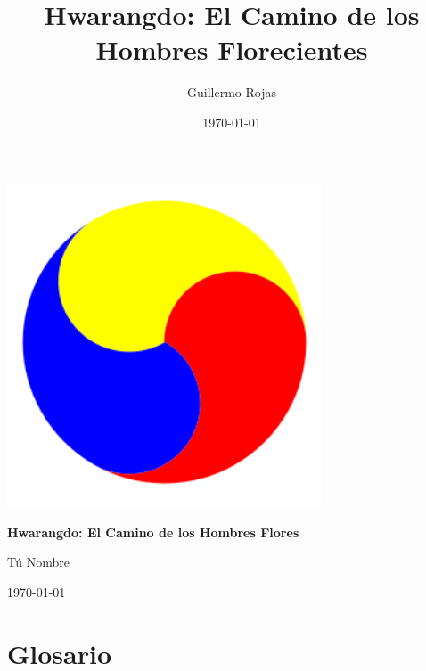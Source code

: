 \documentclass[a4paper,12pt]{book}
\title{Hwarangdo\textregistered: El Camino de los Hombres Florecientes}
\author{Guillermo Rojas}
\date{\today}
\begin{document}
	\begin{titlepage}

		\centering
		\vspace*{\fill}
		\includegraphics[width=0.7\textwidth]{images/sam_taeguk.png} %
		\vspace*{\fill}

		\vspace*{2cm}

		{\Huge\bfseries Hwarangdo\textregistered: El Camino de los Hombres Flores\par}
		\vspace{2cm}
		{\Large Tú Nombre\par}

		\vspace*{\fill}
		{\large \today\par}
	\end{titlepage}

	\tableofcontents

	\frontmatter %



	
	
	
	
	
	

	
	
	
	
%	
%	
%	
%	
%	
%	

%	


	
	\chapter{Glosario}
	\printglossaries

	\appendix

	\clearpage

	\printglossary

	\clearpage

	\appendix

	
\end{document}
